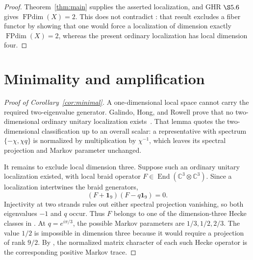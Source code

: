 \documentclass[11pt]{article}
\theoremstyle{remark}
\newcommand{\Id}{\mathbf 1}
\newcommand{\End}{\operatorname{End}}
\newcommand{\bbC}{\mathbb C}
\begin{document}
\begin{proof}
Theorem~\ref{thm:main} supplies the asserted localization, and GHR \(\S5.6\)
gives \(\operatorname{FPdim}(X)=2\).  This does not contradict
\cite[Theorem~5.27]{GHR2013}: that result excludes a fiber functor by showing
that one would force a localization of dimension exactly
\(\operatorname{FPdim}(X)=2\), whereas the present ordinary localization has
local dimension four.
\end{proof}

\section{Minimality and amplification}\label{sec:consequences}

\begin{proof}[Proof of Corollary~\ref{cor:minimal}]
A one-dimensional local space cannot carry the required two-eigenvalue
generator.  Galindo, Hong, and Rowell prove that no two-dimensional ordinary
unitary localization exists~\cite[Lemma 5.26]{GHR2013}.  That lemma quotes the
two-dimensional classification up to an overall scalar: a representative
with spectrum \(\{-\chi,\chi q\}\) is normalized by multiplication by
\(\chi^{-1}\), which leaves its spectral projection and Markov parameter
unchanged.

It remains to exclude local dimension three.  Suppose such an ordinary
unitary localization existed, with local braid operator
\(F\in\End(\bbC^3\otimes\bbC^3)\).  Since a localization intertwines the
braid generators,
\[
  (F+\Id_9)(F-q\Id_9)=0.
\]
Injectivity at two strands rules out either spectral projection vanishing,
so both eigenvalues \(-1\) and \(q\) occur.  Thus \(F\) belongs to one of the
dimension-three Hecke classes in
\cite[Theorem~3.4]{Lechner2026}.  At \(q=e^{i\pi/3}\), the possible Markov
parameters are \(1/3,1/2,2/3\).  The value \(1/2\) is impossible in dimension
three because it would require a projection of rank \(9/2\).  By
\cite[Lemma~3.1]{Lechner2026}, the normalized matrix character of each such
Hecke operator is the corresponding positive Markov trace.


\end{proof}
\end{document}
